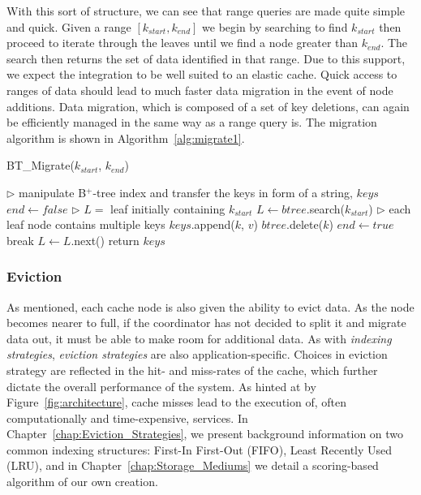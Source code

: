 With this sort of structure, we can see that range queries are made quite
simple and quick. Given a range $[k_{start}, k_{end}]$ we begin by searching to
find $k_{start}$ then proceed to iterate through the leaves until we find a
node greater than $k_{end}$. The search then returns the set of data identified
in that range. Due to this support, we expect the \bptree integration to be
well suited to an elastic cache. Quick access to ranges of data should lead to
much faster data migration in the event of node additions. Data migration,
which is composed of a set of key deletions, can again be efficiently managed
in the same way as a range query is. The \bptree migration algorithm is shown
in Algorithm~\ref{alg:migrate1}.

\begin{algorithm}[htp]
\small
\caption{\label{alg:migrate1}BT\_Migrate($k_{start}$, $k_{end}$)} \begin{algorithmic}[1]
\STATE $\triangleright$ manipulate B$^+$-tree index and transfer the keys in form of a string, $keys$
\STATE $end \leftarrow false$
\STATE $\triangleright$ $L =$ leaf initially containing $k_{start}$ 
\STATE $L \leftarrow btree$.search($k_{start}$)
 \STATE $\triangleright$ each leaf node contains multiple keys
     \STATE $keys$.append($k$, $v$)
     \STATE $btree$.delete($k$)
   \ELSE
     \STATE $end \leftarrow true$
     \STATE break
   \ENDIF
 \ENDFOR
 \STATE $L \leftarrow L$.next()
\ENDWHILE
\STATE return $keys$
\end{algorithmic}
\end{algorithm}



\subsubsection{Eviction} %
\label{sub:cache_eviction}

As mentioned, each cache node is also given the ability to evict data. As the
node becomes nearer to full, if the coordinator has not decided to split it
and migrate data out, it must be able to make room for additional data. As with
\emph{indexing strategies}, \emph{eviction strategies} are also
application-specific. Choices in eviction strategy are reflected in the hit-
and miss-rates of the cache, which further dictate the overall performance of
the system. As hinted at by Figure~\ref{fig:architecture}, cache misses lead to
the execution of, often computationally and time-expensive, services. In
Chapter~\ref{chap:Eviction_Strategies}, we present background information on
two common indexing structures: First-In First-Out (FIFO), Least Recently Used
(LRU), and in Chapter~\ref{chap:Storage_Mediums} we detail a scoring-based
algorithm of our own creation.

